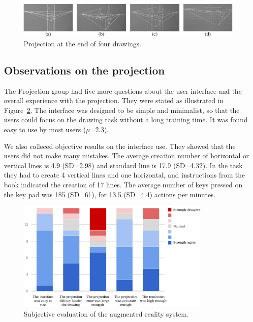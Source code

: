\documentclass{sigchi}
\begin{document}
  
 \begin{figure}[htp]
  \centering 
  \includegraphics[width=180mm]{4dessins.pdf}
  \caption{Projection at the end of four drawings.}
  \label{fig:group}
\end{figure}

 
\subsection{Observations on the projection}

The Projection group had five more questions about the user interface
and the overall experience with the projection. They were stated as
illustrated in Figure~\ref{fig:projection}.
The interface was designed to be simple and minimalist, so that the
users could focus on the drawing task without a long training
time. It was found easy to use by most users ($\mu$=2.3). 

We also colleced objective results on the interface use. 
They showed that the users did
not make many mistakes. The average creation number of horizontal or
vertical lines is 4.9 (SD=2.98) and standard line is 17.9 (SD=4.32). In 
the task they had to create 4 vertical lines and one horizontal, and
instructions from the book indicated the creation of 17 lines. 
The average number of keys pressed on the key pad was 185 (SD=61), for 13.5
(SD=4.4) actions per minutes. 


    \begin{figure}[htb]
      \hspace{-5mm}
      \includegraphics[width=95mm]{interfaceUse.pdf}
      \caption{Subjective evaluation of the augmented reality system.}
      \label{fig:projection}
    \end{figure}
\end{document}
